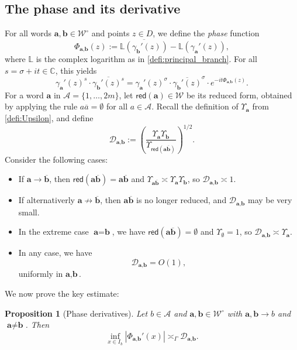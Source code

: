 \documentclass[12pt,letterpaper]{amsart}
\theoremstyle{plain}
\newtheorem{prop}{Proposition}[section]
\theoremstyle{definition}
\theoremstyle{remark}
\newcommand{\Aa}{\textbf{a}}
\newcommand{\Bb}{\textbf{b}}
\newcommand{\CC}{\mathbb{C}}
\begin{document}
\subsection{The phase and its derivative}\label{sec:phaseder}
For all words $\Aa, \Bb \in \mathcal{W}^\circ$ and points $z \in D$, we define the \textit{phase} function
\begin{equation}\label{phase}
\Phi_{\Aa, \Bb}(z) := \overline{\mathbb{L}(\gamma_{\Bb}'(z))} -\mathbb{L}(\gamma_{\Aa}'(z)),
\end{equation}
where $\mathbb{L}$ is the complex logarithm as in \eqref{defi:principal_branch}. For all $s = \sigma + i t \in \CC$, this yields
\[
\gamma_{\Aa}'(z)^s \cdot \overline{\gamma_{\Bb}'(z)^s}
= \gamma_{\Aa}'(z)^{\sigma} \cdot \overline{\gamma_{\Bb}'(z)}^{\sigma} \cdot e^{-i t \Phi_{\Aa, \Bb}(z)}.
\]
For a word $\textbf{a}$ in $\mathcal{A} = \{1, \dots, 2m\}$, let $\mathsf{red}(\textbf{a}) \in \mathcal{W}$ be its reduced form, obtained by applying the rule $a\overline{a} = \emptyset$ for all $a\in \mathcal{A}$. Recall the definition of $\Upsilon_{\Aa}$ from \eqref{defi:Upsilon}, and define
\begin{equation}\label{Dab}
\mathcal{D}_{\Aa, \Bb} := \left( \frac{\Upsilon_{\Aa} \Upsilon_{\Bb}}{\Upsilon_{\mathsf{red}(\Aa \overline{\Bb})}} \right)^{1/2}.
\end{equation}
Consider the following cases:
\begin{itemize}
\item If $\Aa \to \overline{\Bb}$, then $\mathsf{red}(\Aa \overline{\Bb}) = \Aa \overline{\Bb}$ and $\Upsilon_{\Aa \overline{\Bb}} \asymp \Upsilon_{\Aa} \Upsilon_{\Bb}$, so $\mathcal{D}_{\Aa, \Bb} \asymp 1$.
\item If alternativerly $\Aa \not\to \overline{\Bb}$, then $\Aa \overline{\Bb}$ is no longer reduced, and $\mathcal{D}_{\Aa, \Bb}$ may be very small.
\item In the extreme case $\Aa = \Bb$, we have $\mathsf{red}(\Aa \overline{\Bb}) = \emptyset$ and $\Upsilon_{\emptyset} = 1$, so $\mathcal{D}_{\Aa, \Bb} \asymp \Upsilon_\Aa$.
\item In any case, we have
\begin{equation}\label{eq:uniformDab}
\mathcal{D}_{\Aa, \Bb} = O(1),
\end{equation}
uniformly in $\Aa, \Bb$.
\end{itemize}

We now prove the key estimate:

\begin{prop}[Phase derivatives]\label{prop:phaseDerivative}
Let $b \in \mathcal{A}$ and $\Aa, \Bb \in \mathcal{W}^\circ$ with $\Aa, \Bb \to b$ and $\Aa \ne \Bb$. Then
\[
\inf_{x \in I_b} |\Phi_{\Aa, \Bb}'(x)| \asymp_\Gamma \mathcal{D}_{\Aa, \Bb}.
\]
\end{prop}
\end{document}
